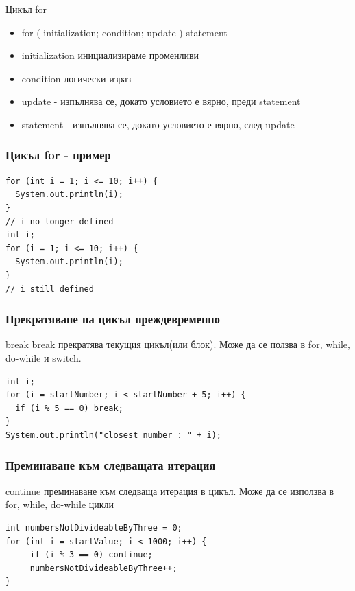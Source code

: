 \documentclass{beamer}
\begin{document}
\begin{frame}{Цикъл for}
  \transdissolve
  \begin{itemize}
  \item for ( initialization; condition; update )  {statement} \pause
  \item initialization инициализираме променливи \pause
  \item condition логически израз \pause
  \item update - изпълнява се, докато
    условието е вярно, преди statement \pause
  \item statement - изпълнява се, докато
    условието е вярно, след update
  \end{itemize}
\end{frame}

\begin{frame}[fragile]
  \frametitle{Цикъл for - пример}
  \transdissolve
\begin{lstlisting}
for (int i = 1; i <= 10; i++) {
  System.out.println(i);
}
// i no longer defined
int i;
for (i = 1; i <= 10; i++) {
  System.out.println(i);
}
// i still defined
\end{lstlisting}
\end{frame}

\begin{frame}[fragile]
  \frametitle{Прекратяване на цикъл преждевременно}
  \transdissolve
  \transdissolve
  \begin{block}{break}
    break прекратява текущия цикъл(или блок). Може
    да се ползва в for, while, do-while и
    switch.
  \end{block}
\begin{lstlisting}
int i;
for (i = startNumber; i < startNumber + 5; i++) {
  if (i % 5 == 0) break; 
}
System.out.println("closest number : " + i);
\end{lstlisting}
\end{frame}

\begin{frame}[fragile]
  \frametitle{Преминаване към следващата итерация}
  \transdissolve
  \begin{block}{continue}
    преминаване към следваща
    итерация в цикъл. Може да се
    използва в for, while, do-while цикли
  \end{block}
\begin{lstlisting}
int numbersNotDivideableByThree = 0;
for (int i = startValue; i < 1000; i++) {
     if (i % 3 == 0) continue;
     numbersNotDivideableByThree++; 
}
\end{lstlisting}
\end{frame}
\end{document}
